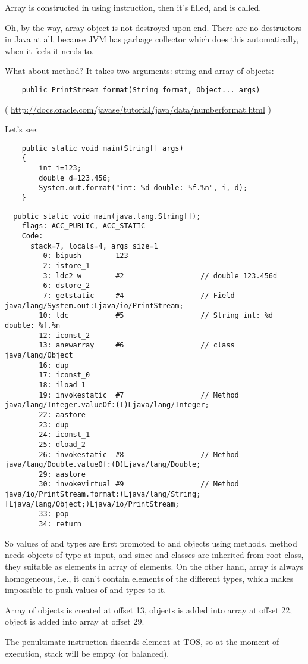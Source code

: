 Array is constructed in \main using  instruction, 
then it's filled, and  is called.

Oh, by the way, array object is not destroyed upon \main end.
There are no destructors in Java at all, because JVM has garbage collector which does this
automatically, when it feels it needs to.

What about  method?
It takes two arguments: string and array of objects:

\begin{lstlisting}
	public PrintStream format(String format, Object... args)
\end{lstlisting}
( \url{http://docs.oracle.com/javase/tutorial/java/data/numberformat.html} )

Let's see:

\begin{lstlisting}
	public static void main(String[] args)
	{
		int i=123;
		double d=123.456;
		System.out.format("int: %d double: %f.%n", i, d);
	}
\end{lstlisting}

\begin{lstlisting}
  public static void main(java.lang.String[]);
    flags: ACC_PUBLIC, ACC_STATIC
    Code:
      stack=7, locals=4, args_size=1
         0: bipush        123
         2: istore_1      
         3: ldc2_w        #2                  // double 123.456d
         6: dstore_2      
         7: getstatic     #4                  // Field java/lang/System.out:Ljava/io/PrintStream;
        10: ldc           #5                  // String int: %d double: %f.%n
        12: iconst_2      
        13: anewarray     #6                  // class java/lang/Object
        16: dup           
        17: iconst_0      
        18: iload_1       
        19: invokestatic  #7                  // Method java/lang/Integer.valueOf:(I)Ljava/lang/Integer;
        22: aastore       
        23: dup           
        24: iconst_1      
        25: dload_2       
        26: invokestatic  #8                  // Method java/lang/Double.valueOf:(D)Ljava/lang/Double;
        29: aastore       
        30: invokevirtual #9                  // Method java/io/PrintStream.format:(Ljava/lang/String;[Ljava/lang/Object;)Ljava/io/PrintStream;
        33: pop           
        34: return        
\end{lstlisting}

So values of  and  types are first promoted to  and  
objects using  methods.
 method needs objects of  type at input, and since  and 
 classes are inherited from root  class, they suitable as elements 
in array of  elements.
On the other hand, array is always homogeneous, i.e., it can't contain elements of the 
different types, which makes impossible to push values of  and  types to it.

Array of  objects is created at offset 13,  objects is added into array at offset
22,  object is added into array at offset 29.

The penultimate  instruction discards element at \ac{TOS}, 
so at the moment of  execution, stack will be empty (or balanced).
